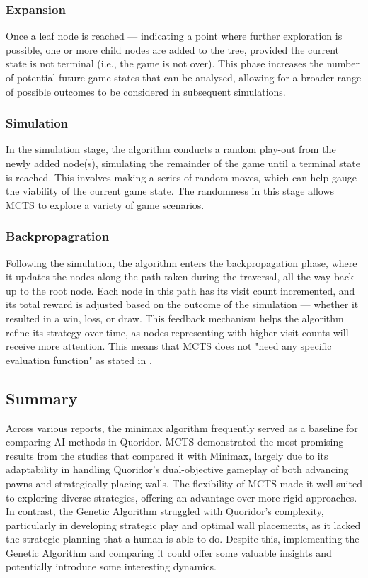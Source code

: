 \documentclass[review]{cmpreport}
\begin{document}
\subsubsection{Expansion}
Once a leaf node is reached — indicating a point where further exploration is possible, one or more child nodes are added to the tree, provided the current state is not terminal (i.e., the game is not over). This phase increases the number of potential future game states that can be analysed, allowing for a broader range of possible outcomes to be considered in subsequent simulations.

\subsubsection{Simulation}
In the simulation stage, the algorithm conducts a random play-out from the newly added node(s), simulating the remainder of the game until a terminal state is reached. This involves making a series of random moves, which can help gauge the viability of the current game state. The randomness in this stage allows MCTS to explore a variety of game scenarios.

\subsubsection{Backpropagration}
Following the simulation, the algorithm enters the backpropagation phase, where it updates the nodes along the path taken during the traversal, all the way back up to the root node. Each node in this path has its visit count incremented, and its total reward is adjusted based on the outcome of the simulation — whether it resulted in a win, loss, or draw. This feedback mechanism helps the algorithm refine its strategy over time, as nodes representing with higher visit counts will receive more attention. This means that MCTS does not "need any specific evaluation function" as stated in \cite{brenner2015artificial}.

\subsection{Summary}
Across various reports, the minimax algorithm frequently served as a baseline for comparing AI methods in Quoridor. MCTS demonstrated the most promising results from the studies that compared it with Minimax, largely due to its adaptability in handling Quoridor’s dual-objective gameplay of both advancing pawns and strategically placing walls. The flexibility of MCTS made it well suited to exploring diverse strategies, offering an advantage over more rigid approaches. In contrast, the Genetic Algorithm struggled with Quoridor’s complexity, particularly in developing strategic play and optimal wall placements, as it lacked the strategic planning that a human is able to do. Despite this, implementing the Genetic Algorithm and comparing it could offer some valuable insights and potentially introduce some interesting dynamics.
\newline
\end{document}
